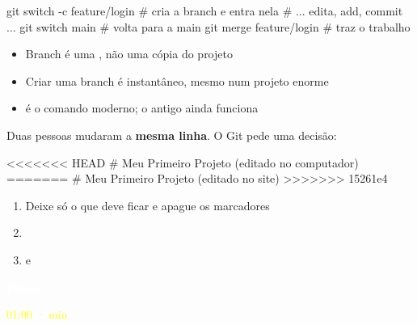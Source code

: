 \begin{frame}[fragile]{}
\begin{sh}
git switch -c feature/login      # cria a branch e entra nela
# ... edita, add, commit ...
git switch main                  # volta para a main
git merge feature/login          # traz o trabalho
\end{sh}

  \vspace{0.5em}
  \begin{itemize}
    \item Branch é uma , não uma cópia do projeto
    \item Criar uma branch é instantâneo, mesmo num projeto enorme
    \item {} é o comando moderno; o  antigo ainda funciona
  \end{itemize}

\end{frame}

\begin{frame}[fragile]{}
  \vspace{0.2em}
  {\small Duas pessoas mudaram a \textbf{mesma linha}. O Git pede uma decisão:}
\begin{sh}
<<<<<<< HEAD
# Meu Primeiro Projeto (editado no computador)
=======
# Meu Primeiro Projeto (editado no site)
>>>>>>> 15261e4
\end{sh}
  \begin{enumerate}
    \item Deixe só o que deve ficar e apague os marcadores
    \item {}
    \item {} e 
  \end{enumerate}
  \begin{center}
  \end{center}

\end{frame}

\begin{frame}[plain]
  \vfill
  \begin{center}
    {\fontsize{30}{36}\selectfont\textbf{\textcolor{white}{Pausa}}}

    \vspace{1em}
    {\lexendsemibold\textcolor{yellow}{\large 01:00 \quad ·  min}}
  \end{center}
  \vfill

\end{frame}

